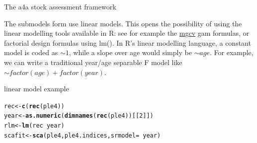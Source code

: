 \documentclass{beamer}\usepackage[]{graphicx}\usepackage[]{color}
\makeatletter
\newcommand{\hlnum}[1]{\textcolor[rgb]{0.686,0.059,0.569}{#1}}%
\newcommand{\hlopt}[1]{\textcolor[rgb]{0,0,0}{#1}}%
\newcommand{\hlstd}[1]{\textcolor[rgb]{0.345,0.345,0.345}{#1}}%
\newcommand{\hlkwb}[1]{\textcolor[rgb]{0.69,0.353,0.396}{#1}}%
\newcommand{\hlkwc}[1]{\textcolor[rgb]{0.333,0.667,0.333}{#1}}%
\newcommand{\hlkwd}[1]{\textcolor[rgb]{0.737,0.353,0.396}{\textbf{#1}}}%
\newenvironment{kframe}{%
 \def\at@end@of@kframe{}%
 \ifinner\ifhmode%
  \def\at@end@of@kframe{\end{minipage}}%
  \begin{minipage}{\columnwidth}%
 \fi\fi%
 \def\FrameCommand##1{\hskip\@totalleftmargin \hskip-\fboxsep
 \colorbox{shadecolor}{##1}\hskip-\fboxsep
     \hskip-\linewidth \hskip-\@totalleftmargin \hskip\columnwidth}%
 \MakeFramed {\advance\hsize-\width
   \@totalleftmargin\z@ \linewidth\hsize
   \@setminipage}}%
 {\par\unskip\endMakeFramed%
 \at@end@of@kframe}
\newenvironment{knitrout}{}{} %
\makeatother
\begin{document}
\begin{frame}{The a4a stock assessment framework}

The submodels form use linear models. This opens the possibility of using the linear modelling tools available in R: see for example the \href{http://cran.r-project.org/web/packages/mgcv/index.html}{mgcv} gam formulas, or factorial design formulas using lm(). In R's linear modelling language, a constant model is coded as $\sim 1$, while a slope over age would simply be $\sim age$. For example, we can write a traditional year/age separable F model like $\sim factor(age) + factor(year)$.

\end{frame}

\begin{frame}{linear model example}

\begin{knitrout}
\color{fgcolor}\begin{kframe}
\begin{alltt}
\hlstd{rec} \hlkwb{<-} \hlkwd{c}\hlstd{(}\hlkwd{rec}\hlstd{(ple4))}
\hlstd{year} \hlkwb{<-} \hlkwd{as.numeric}\hlstd{(}\hlkwd{dimnames}\hlstd{(}\hlkwd{rec}\hlstd{(ple4))[[}\hlnum{2}\hlstd{]])}
\hlstd{rlm} \hlkwb{<-} \hlkwd{lm}\hlstd{(rec} \hlopt{~} \hlstd{year)}
\hlstd{scafit} \hlkwb{<-} \hlkwd{sca}\hlstd{(ple4, ple4.indices,} \hlkwc{srmodel} \hlstd{=} \hlopt{~}\hlstd{year)}
\end{alltt}
\end{kframe}
\end{knitrout}

\end{frame}
\end{document}
